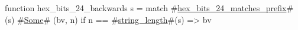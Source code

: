 function hex_bits_24_backwards s =
  match #\hyperref[sailRISCVzhexzybitszy24zymatcheszyprefix]{hex\_bits\_24\_matches\_prefix}#(s) {
      #\hyperref[sailRISCVzSome]{Some}# (bv, n) if n == #\hyperref[sailRISCVzstringzylength]{string\_length}#(s) => bv
  }

